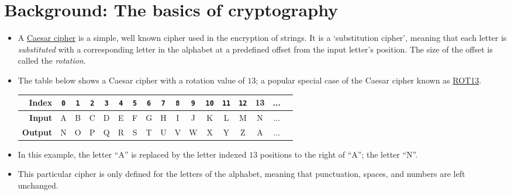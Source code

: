 \documentclass[11pt]{report}
\begin{document}
\section*{Background: The basics of cryptography}
\begin{itemize}
	\item A \href{https://en.wikipedia.org/wiki/Caesar_cipher}{Caesar cipher} is a simple, well known cipher used in the encryption of strings. It is a `substitution cipher', meaning that each letter is \emph{substituted} with a corresponding letter in the alphabet at a predefined offset from the input letter's position. The size of the offset is called the \emph{rotation}.\\
	\item The table below shows a Caesar cipher with a rotation value of $13$; a popular special case of the Caesar cipher known as \href{https://www.wikiwand.com/en/ROT13}{ROT13}.
	\begin{table}[h]
		\centering
		\begin{tabular}{|r|c|c|c|c|c|c|c|c|c|c|c|c|c|c|c|c|}
		\hline
		\textbf{Index} & {\tt 0} & {\tt 1} & {\tt 2} & {\tt 3} & {\tt 4} & {\tt 5} & {\tt 6} & {\tt 7} & {\tt 8} & {\tt 9} & {\tt 10} & {\tt 11} & {\tt 12} & 13 & ... \\ \hline
		\textbf{Input} & A & B & C & D & E & F & G & H & I & J & K  & L  & M & N & ... \\ \hline
		\textbf{Output} & N & O & P & Q & R & S & T & U & V & W & X  & Y  & Z & A & ... \\ \hline
		\end{tabular}
	\end{table}
	\item In this example, the letter ``A'' is replaced by the letter indexed $13$ positions to the right of ``A''; the letter ``N''.
	\item This particular cipher is only defined for the letters of the alphabet, meaning that punctuation, spaces, and numbers are left unchanged.
\end{itemize}

\newpage
\end{document}
